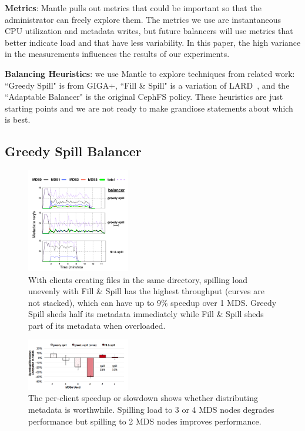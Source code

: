 \textbf{Metrics}: Mantle pulls out metrics that could be important so that the administrator can freely explore them. The metrics we use are instantaneous CPU utilization and metadata writes, but future balancers will use metrics that better indicate load and that have less variability. In this paper, the high variance in the measurements influences the results of our experiments.

\textbf{Balancing Heuristics}: we use Mantle to explore techniques from related work: ``Greedy Spill" is from GIGA+, ``Fill \& Spill" is a variation of LARD~\cite{pai:asplos1998}, and the ``Adaptable Balancer" is the original CephFS policy. These heuristics are just starting points and we are not ready to make grandiose statements about which is best. 

\subsection{Greedy Spill Balancer}
\label{greedy-spill-balancer}
\begin{figure}[tb]
	\centering	
   	\includegraphics[width=0.4\textwidth]{./chapters/mantle/spill-evenly.pdf}
	\caption{With clients creating files in the same directory, spilling load unevenly with Fill \& Spill has the highest throughput (curves are not stacked), which can have up to 9\% speedup over 1 MDS. Greedy Spill sheds half its metadata immediately while Fill \& Spill sheds part of its metadata when overloaded.\label{figure:eval_spill-evenly}}
\end{figure}
\begin{figure}[tb]
	\centering	
	\includegraphics[width=0.4\textwidth]{./chapters/mantle/eval_spill-evenly_bar}
	\caption{The per-client speedup or slowdown shows whether distributing metadata is worthwhile.  Spilling load to 3 or 4 MDS nodes degrades performance but spilling to 2 MDS nodes improves performance.\label{figure:eval_spill-evenly_bar}}
\end{figure}

